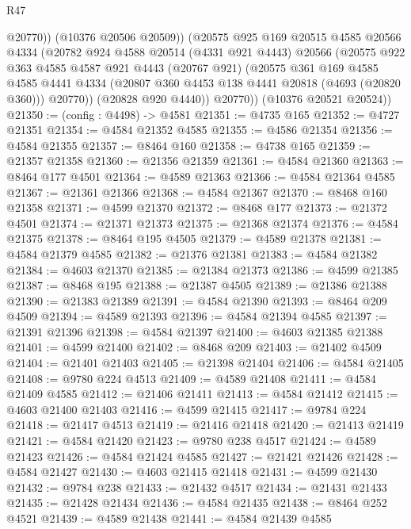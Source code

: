 \begin{lexlean}{R47}
\begin{coremodule}
              @20770))
          (@10376 @20506 @20509))
        (@20575
          @925
          @169
          @20515
          @4585
          @20566
          @4334
          (@20782
            @924
            @4588
            @20514
            (@4331 @921 @4443)
            @20566
            (@20575
              @922
              @363
              @4585
              @4587
              @921
              @4443
              (@20767 @921)
              (@20575
                @361
                @169
                @4585
                @4585
                @4441
                @4334
                (@20807 @360 @4453 @138 @4441 @20818 (@4693 (@20820 @360)))
                @20770))
            (@20828 @920 @4440))
          @20770))
      (@10376 @20521 @20524))
@21350 := (config : @4498) -> @4581
@21351 := @4735 @165
@21352 := @4727 @21351
@21354 := @4584 @21352 @4585
@21355 := @4586 @21354
@21356 := @4584 @21355
@21357 := @8464 @160
@21358 := @4738 @165
@21359 := @21357 @21358
@21360 := @21356 @21359
@21361 := @4584 @21360
@21363 := @8464 @177 @4501
@21364 := @4589 @21363
@21366 := @4584 @21364 @4585
@21367 := @21361 @21366
@21368 := @4584 @21367
@21370 := @8468 @160 @21358
@21371 := @4599 @21370
@21372 := @8468 @177
@21373 := @21372 @4501
@21374 := @21371 @21373
@21375 := @21368 @21374
@21376 := @4584 @21375
@21378 := @8464 @195 @4505
@21379 := @4589 @21378
@21381 := @4584 @21379 @4585
@21382 := @21376 @21381
@21383 := @4584 @21382
@21384 := @4603 @21370
@21385 := @21384 @21373
@21386 := @4599 @21385
@21387 := @8468 @195
@21388 := @21387 @4505
@21389 := @21386 @21388
@21390 := @21383 @21389
@21391 := @4584 @21390
@21393 := @8464 @209 @4509
@21394 := @4589 @21393
@21396 := @4584 @21394 @4585
@21397 := @21391 @21396
@21398 := @4584 @21397
@21400 := @4603 @21385 @21388
@21401 := @4599 @21400
@21402 := @8468 @209
@21403 := @21402 @4509
@21404 := @21401 @21403
@21405 := @21398 @21404
@21406 := @4584 @21405
@21408 := @9780 @224 @4513
@21409 := @4589 @21408
@21411 := @4584 @21409 @4585
@21412 := @21406 @21411
@21413 := @4584 @21412
@21415 := @4603 @21400 @21403
@21416 := @4599 @21415
@21417 := @9784 @224
@21418 := @21417 @4513
@21419 := @21416 @21418
@21420 := @21413 @21419
@21421 := @4584 @21420
@21423 := @9780 @238 @4517
@21424 := @4589 @21423
@21426 := @4584 @21424 @4585
@21427 := @21421 @21426
@21428 := @4584 @21427
@21430 := @4603 @21415 @21418
@21431 := @4599 @21430
@21432 := @9784 @238
@21433 := @21432 @4517
@21434 := @21431 @21433
@21435 := @21428 @21434
@21436 := @4584 @21435
@21438 := @8464 @252 @4521
@21439 := @4589 @21438
@21441 := @4584 @21439 @4585

\end{coremodule}
\end{lexlean}

